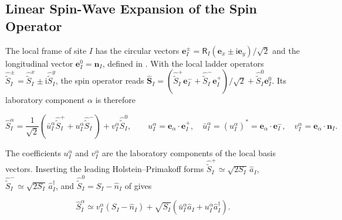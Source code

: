 \subsection{Linear Spin-Wave Expansion of the Spin Operator}

The local frame of site \(I\) has the circular vectors \(\mathbf e_I^\pm=\mathsf R_I(\mathbf e_x\pm\mathrm i\mathbf e_y)/\sqrt2\) and the longitudinal vector \(\mathbf e_I^0=\mathbf n_I\), defined in . With the local ladder operators \(\hat{\widetilde S}_I^\pm=\hat{\widetilde S}_I^x\pm\mathrm i\hat{\widetilde S}_I^y\), the spin operator reads \(\hat{\mathbf S}_I=(\hat{\widetilde S}_I^+\mathbf e_I^-+\hat{\widetilde S}_I^-\mathbf e_I^+)/\sqrt2+\hat{\widetilde S}_I^0\mathbf e_I^0\). Its laboratory component \(\alpha\) is therefore

\[
\hat S_I^\alpha
=\frac{1}{\sqrt2}\left(\bar u_I^\alpha\hat{\widetilde S}_I^++u_I^\alpha\hat{\widetilde S}_I^-\right)+v_I^\alpha\hat{\widetilde S}_I^0,
\qquad
u_I^\alpha=\mathbf e_\alpha\cdot\mathbf e_I^+,
\quad
\bar u_I^\alpha=(u_I^\alpha)^*=\mathbf e_\alpha\cdot\mathbf e_I^-,
\quad
v_I^\alpha=\mathbf e_\alpha\cdot\mathbf n_I.
\]

The coefficients \(u_I^\alpha\) and \(v_I^\alpha\) are the laboratory components of the local basis vectors. Inserting the leading Holstein--Primakoff forms \(\hat{\widetilde S}_I^+\simeq\sqrt{2S_I}\,\hat a_I\), \(\hat{\widetilde S}_I^-\simeq\sqrt{2S_I}\,\hat a_I^\dagger\), and \(\hat{\widetilde S}_I^0=S_I-\hat n_I\) of  gives

\begin{equation}\label{eq-lswt-spin-operator-expansion}
\hat S_I^\alpha
\simeq v_I^\alpha\left(S_I-\hat n_I\right)
+\sqrt{S_I}\left(\bar u_I^\alpha\hat a_I+u_I^\alpha\hat a_I^\dagger\right).
\end{equation}


